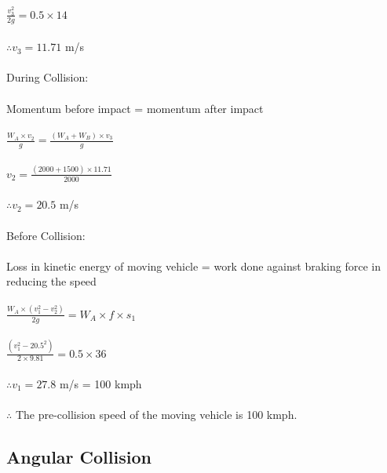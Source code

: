 $ \frac{v_3^2}{2g} = 0.5 \times 14 $\\\\
$ \therefore v_3 = 11.71 $ m/s \\\\
During Collision:\\\\
Momentum before impact = momentum after impact\\\\
$ \frac{W_A \times v_2}{g} = \frac{(W_A + W_B) \times v_3}{g}$\\\\
$ v_2 = \frac{(2000 + 1500) \times 11.71}{2000} $\\\\
$ \therefore v_2 = 20.5 $ m/s\\\\
Before Collision:\\\\
Loss in kinetic energy of moving vehicle = work done against braking force in reducing the speed\\\\
$ \frac{W_A \times (v_1^2 - v_2^2)}{2g} = W_A \times f \times s_1 $\\\\
$ \frac{(v_1^2 - 20.5^2)}{2 \times 9.81} = 0.5 \times 36 $\\\\
$ \therefore v_1 = 27.8 $ m/s = 100 kmph\\\\
$ \therefore $ The pre-collision speed of the moving vehicle is 100 kmph.
%
\subsection{Angular Collision}

